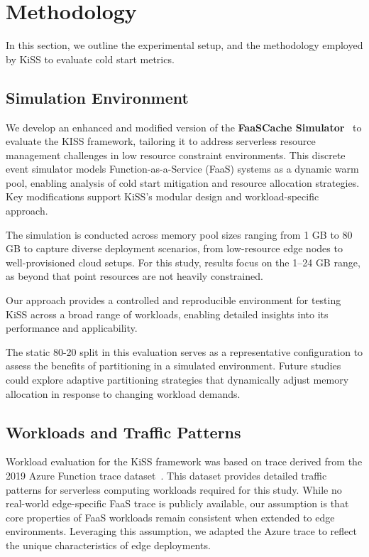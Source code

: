 \section{Methodology}\label{sec:method}

In this section, we outline the experimental setup, and the methodology employed by KiSS to evaluate cold start metrics.

\subsection{Simulation Environment}
We develop an enhanced and modified version of the \textbf{FaaSCache Simulator}~\cite{alexander_faascache_2021} to evaluate the KISS framework, tailoring it to address serverless resource management challenges in low resource constraint environments. This discrete event simulator models Function-as-a-Service (FaaS) systems as a dynamic warm pool, enabling analysis of cold start mitigation and resource allocation strategies. Key modifications support KiSS’s modular design and workload-specific approach.

The simulation is conducted across memory pool sizes ranging from 1 GB to 80 GB to capture diverse deployment scenarios, from low-resource edge nodes to well-provisioned cloud setups. For this study, results focus on the 1–24 GB range, as beyond that point resources are not heavily constrained.



Our approach provides a controlled and reproducible environment for testing KiSS across a broad range of workloads, enabling detailed insights into its performance and applicability.



The static 80-20 split in this evaluation serves as a representative configuration to assess the benefits of partitioning in a simulated environment.
Future studies could explore adaptive partitioning strategies that dynamically adjust memory allocation in response to changing workload demands.

\subsection{Workloads and Traffic Patterns}

Workload evaluation for the KiSS framework was based on trace derived from the 2019 Azure Function trace dataset~\cite{mohammad_serverless_2020}. This dataset provides detailed traffic patterns for serverless computing workloads required for this study. While no real-world edge-specific FaaS trace is publicly available, our assumption is that core properties of FaaS workloads remain consistent when extended to edge environments. Leveraging this assumption, we adapted the Azure trace to reflect the unique characteristics of edge deployments.

